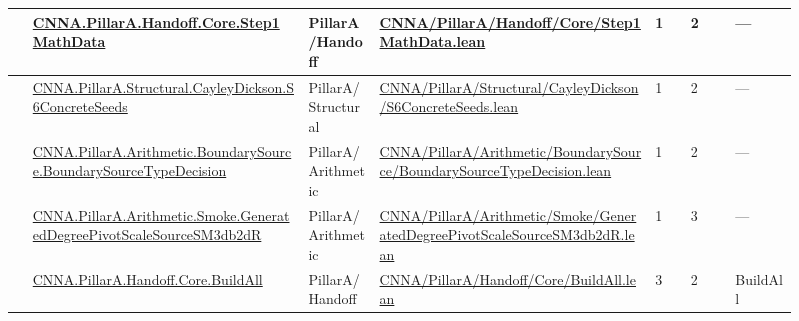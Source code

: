 \begin{longtable}{L{0.025\linewidth} L{0.315\linewidth} L{0.08\linewidth} L{0.315\linewidth} L{0.045\linewidth} L{0.055\linewidth} L{0.07\linewidth}}
\hline
{} & \href{run:repo_snapshot/CNNA/PillarA/Handoff/Core/Step1MathData.lean}{CNNA.\allowbreak{}PillarA.\allowbreak{}Handoff.\allowbreak{}Core.\allowbreak{}Step1MathData} & PillarA/\allowbreak{}Handoff & \href{run:repo_snapshot/CNNA/PillarA/Handoff/Core/Step1MathData.lean}{CNNA/\allowbreak{}PillarA/\allowbreak{}Handoff/\allowbreak{}Core/\allowbreak{}Step1MathData.\allowbreak{}lean} & 1 & 2 & ---\\
\hline
{} & \href{run:repo_snapshot/CNNA/PillarA/Structural/CayleyDickson/S6ConcreteSeeds.lean}{CNNA.\allowbreak{}PillarA.\allowbreak{}Structural.\allowbreak{}CayleyDickson.\allowbreak{}S6ConcreteSeeds} & PillarA/\allowbreak{}Structural & \href{run:repo_snapshot/CNNA/PillarA/Structural/CayleyDickson/S6ConcreteSeeds.lean}{CNNA/\allowbreak{}PillarA/\allowbreak{}Structural/\allowbreak{}CayleyDickson/\allowbreak{}S6ConcreteSeeds.\allowbreak{}lean} & 1 & 2 & ---\\
\hline
{} & \href{run:repo_snapshot/CNNA/PillarA/Arithmetic/BoundarySource/BoundarySourceTypeDecision.lean}{CNNA.\allowbreak{}PillarA.\allowbreak{}Arithmetic.\allowbreak{}BoundarySource.\allowbreak{}BoundarySourceTypeDecision} & PillarA/\allowbreak{}Arithmetic & \href{run:repo_snapshot/CNNA/PillarA/Arithmetic/BoundarySource/BoundarySourceTypeDecision.lean}{CNNA/\allowbreak{}PillarA/\allowbreak{}Arithmetic/\allowbreak{}BoundarySource/\allowbreak{}BoundarySourceTypeDecision.\allowbreak{}lean} & 1 & 2 & ---\\
\hline
{} & \href{run:repo_snapshot/CNNA/PillarA/Arithmetic/Smoke/GeneratedDegreePivotScaleSourceSM3db2dR.lean}{CNNA.\allowbreak{}PillarA.\allowbreak{}Arithmetic.\allowbreak{}Smoke.\allowbreak{}GeneratedDegreePivotScaleSourceSM3db2dR} & PillarA/\allowbreak{}Arithmetic & \href{run:repo_snapshot/CNNA/PillarA/Arithmetic/Smoke/GeneratedDegreePivotScaleSourceSM3db2dR.lean}{CNNA/\allowbreak{}PillarA/\allowbreak{}Arithmetic/\allowbreak{}Smoke/\allowbreak{}GeneratedDegreePivotScaleSourceSM3db2dR.\allowbreak{}lean} & 1 & 3 & ---\\
\hline
{} & \href{run:repo_snapshot/CNNA/PillarA/Handoff/Core/BuildAll.lean}{CNNA.\allowbreak{}PillarA.\allowbreak{}Handoff.\allowbreak{}Core.\allowbreak{}BuildAll} & PillarA/\allowbreak{}Handoff & \href{run:repo_snapshot/CNNA/PillarA/Handoff/Core/BuildAll.lean}{CNNA/\allowbreak{}PillarA/\allowbreak{}Handoff/\allowbreak{}Core/\allowbreak{}BuildAll.\allowbreak{}lean} & 3 & 2 & BuildAll\\

\end{longtable}
